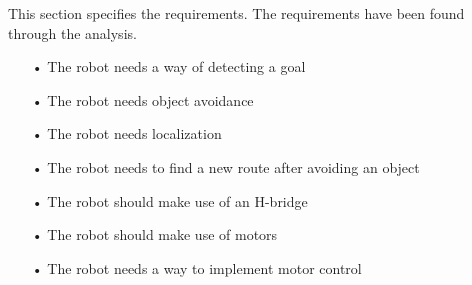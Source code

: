 This section specifies the requirements. The requirements have been found through the analysis.
\begin{enumerate}
	\item[•]The robot needs a way of detecting a goal
	\item[•]The robot needs object avoidance
	\item[•]The robot needs localization
	\item[•]The robot needs to find a new route after avoiding an object
	\item[•]The robot should make use of an H-bridge
	\item[•]The robot should make use of motors
	\item[•]The robot needs a way to implement motor control
\end{enumerate}

%